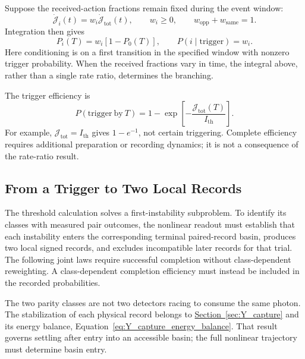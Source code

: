 Suppose the received-action fractions remain fixed during the event window:
\begin{equation}
    \dot{\mathcal J}_i(t)=w_i\dot{\mathcal J}_{\mathrm{tot}}(t),
    \qquad w_i\geq0,
    \qquad w_{\mathrm{opp}}+w_{\mathrm{same}}=1.
\end{equation}
Integration then gives
\begin{equation}
    P_i(T)=w_i[1-P_0(T)],
    \qquad
    \boxed{P(i\mid\mathrm{trigger})=w_i}.
    \label{eq:entanglement_action_to_probability}
\end{equation}
Here conditioning is on a first transition in the specified window with nonzero trigger probability. When the received fractions vary in time, the integral above, rather than a single rate ratio, determines the branching.

The trigger efficiency is
\begin{equation}
    \boxed{
    P(\mathrm{trigger\ by}\ T)
    =1-\exp\!\left[-\frac{\mathcal J_{\mathrm{tot}}(T)}{I_{\mathrm{th}}}\right]
    }.
\end{equation}
For example, $\mathcal J_{\mathrm{tot}}=I_{\mathrm{th}}$ gives $1-e^{-1}$, not certain triggering. Complete efficiency requires additional preparation or recording dynamics; it is not a consequence of the rate-ratio result.

\subsection{From a Trigger to Two Local Records}

The threshold calculation solves a first-instability subproblem. To identify its classes with measured pair outcomes, the nonlinear readout must establish that each instability enters the corresponding terminal paired-record basin, produces two local signed records, and excludes incompatible later records for that trial. The following joint laws require successful completion without class-dependent reweighting. A class-dependent completion efficiency must instead be included in the recorded probabilities.

The two parity classes are not two detectors racing to consume the same photon. The stabilization of each physical record belongs to \hyperref[sec:Y_capture]{Section~\ref*{sec:Y_capture}} and its energy balance, Equation~\eqref{eq:Y_capture_energy_balance}. That result governs settling after entry into an accessible basin; the full nonlinear trajectory must determine basin entry.

